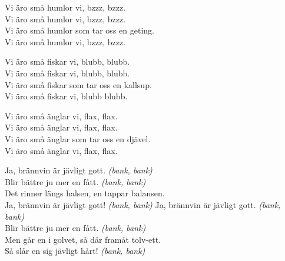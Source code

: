 \documentclass[a6paper, 10pt, twoside]{article}
\begin{document}
\noindent
\begin{center}
\end{center}
\begin{lyrics}
Vi äro små humlor vi, bzzz, bzzz. \\
Vi äro små humlor vi, bzzz, bzzz. \\
Vi äro små humlor som tar oss en geting. \\
Vi äro små humlor vi, bzzz, bzzz. 
\end{lyrics}
\begin{center}
\end{center}
\begin{lyrics}
Vi äro små fiskar vi, blubb, blubb. \\
Vi äro små fiskar vi, blubb, blubb. \\
Vi äro små fiskar som tar oss en kallsup. \\
Vi äro små fiskar vi, blubb blubb. 
\end{lyrics}
\begin{center}
\end{center}
\begin{lyrics}
Vi äro små änglar vi, flax, flax.\\
Vi äro små änglar vi, flax, flax.\\
Vi äro små änglar som tar oss en djävel.\\
Vi äro små änglar vi, flax, flax.
\end{lyrics}
\begin{center}
\end{center}
\begin{lyrics}
Ja, brännvin är jävligt gott. \textit{(bank, bank)}\\
Blir bättre ju mer en fått. \textit{(bank, bank)}\\
Det rinner längs halsen, en tappar balansen. \\
Ja, brännvin är jävligt gott! \textit{(bank, bank)}
\newpage
\noindent
Ja, brännvin är jävligt gott. \textit{(bank, bank)}\\
Blir bättre ju mer en fått. \textit{(bank, bank)}\\
Men går en i golvet, så där framåt tolv-ett. \\
Så slår en sig jävligt hårt! \textit{(bank, bank)}
\end{lyrics}
\end{document}

